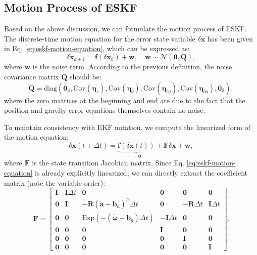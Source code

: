 \subsection{Motion Process of ESKF}
Based on the above discussion, we can formulate the motion process of ESKF. The discrete-time motion equation for the error state variable $\delta \mathbf{x}$ has been given in Eq. \eqref{eq:eskf-motion-equation}, which can be expressed as:
\begin{equation}\label{eq:eskf-motion-process}
	\delta \mathbf{x}_{k+1} = \mathbf{f} (\delta \mathbf{x}_{k}) + \mathbf{w}, \quad \mathbf{w} \sim \mathcal{N}(\mathbf{0}, \mathbf{Q}),
\end{equation}
where $\mathbf{w}$ is the noise term. According to the previous definition, the noise covariance matrix $\mathbf{Q}$ should be:
\begin{equation}\label{eq:eskf-Q-matrix}
	\mathbf{Q} = \mathrm{diag}\left(\mathbf{0}_3, \mathrm{Cov}(\boldsymbol{\eta}_v), \mathrm{Cov}(\boldsymbol{\eta}_{\theta}), \mathrm{Cov}(\boldsymbol{\eta}_{bg}), \mathrm{Cov}(\boldsymbol{\eta}_{ba}), \mathbf{0}_3\right),
\end{equation}
where the zero matrices at the beginning and end are due to the fact that the position and gravity error equations themselves contain no noise.

To maintain consistency with EKF notation, we compute the linearized form of the motion equation:
\begin{equation}\label{eq:eskf-linearized}
	\delta \mathbf{x}(t+\Delta t) = \underbrace{\mathbf{f}(\delta \mathbf{x}(t))}_{=\mathbf{0}} + \mathbf{F} \delta \mathbf{x} + \mathbf{w},
\end{equation}
where $\mathbf{F}$ is the state transition Jacobian matrix. Since Eq. \eqref{eq:eskf-motion-equation} is already explicitly linearized, we can directly extract the coefficient matrix (note the variable order):
\begin{equation}\label{eq:eskf-F-matrix}
	\mathbf{F} = \begin{bmatrix}
		\mathbf{I} & \mathbf{I} \Delta t & \mathbf{0} & \mathbf{0} & \mathbf{0} & \mathbf{0} \\
		\mathbf{0} & \mathbf{I} & - \mathbf{R}(\tilde{\mathbf{a}} - \mathbf{b}_a)^\wedge \Delta t & \mathbf{0} & -\mathbf{R} \Delta t & \mathbf{I} \Delta t \\
		\mathbf{0} & \mathbf{0} & \mathrm{Exp}\left( -(\tilde{\boldsymbol{\omega}} - \mathbf{b}_g) \Delta t \right) &  -\mathbf{I} \Delta t & \mathbf{0} & \mathbf{0} \\
		\mathbf{0} & \mathbf{0} & \mathbf{0} & \mathbf{I} & \mathbf{0} & \mathbf{0} \\
		\mathbf{0} & \mathbf{0} & \mathbf{0} & \mathbf{0} & \mathbf{I} & \mathbf{0} \\
		\mathbf{0} & \mathbf{0} & \mathbf{0} & \mathbf{0} & \mathbf{0} & \mathbf{I} 
	\end{bmatrix}.
\end{equation}

